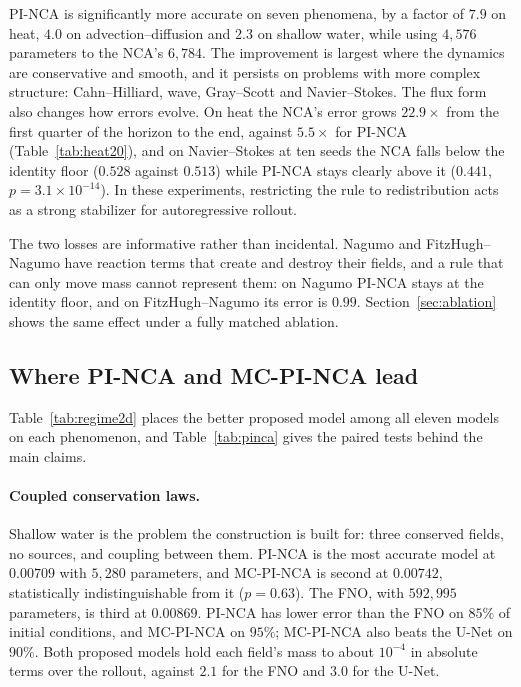 \documentclass{article}
\begin{document}
PI-NCA is significantly more accurate on seven phenomena, by a factor of $7.9$ on heat,
$4.0$ on advection--diffusion and $2.3$ on shallow water, while using $4{,}576$
parameters to the NCA's $6{,}784$. The improvement is largest where the dynamics are
conservative and smooth, and it persists on problems with more complex structure:
Cahn--Hilliard, wave, Gray--Scott and Navier--Stokes. The flux form also changes how errors
evolve. On heat the NCA's error grows $22.9\times$ from the first quarter of the horizon to
the end, against $5.5\times$ for PI-NCA (Table~\ref{tab:heat20}), and on Navier--Stokes at
ten seeds the NCA falls below the identity floor ($0.528$ against $0.513$) while PI-NCA
stays clearly above it ($0.441$, $p=3.1\times10^{-14}$). In these experiments, restricting
the rule to redistribution acts as a strong stabilizer for autoregressive rollout.

The two losses are informative rather than incidental. Nagumo and FitzHugh--Nagumo have
reaction terms that create and destroy their fields, and a rule that can only move mass
cannot represent them: on Nagumo PI-NCA stays at the identity floor, and on
FitzHugh--Nagumo its error is $0.99$. Section~\ref{sec:ablation} shows the same effect under
a fully matched ablation.

\subsection{Where PI-NCA and MC-PI-NCA lead}
\label{sec:leads}
Table~\ref{tab:regime2d} places the better proposed model among all eleven models on each
phenomenon, and Table~\ref{tab:pinca} gives the paired tests behind the main claims.



\paragraph{Coupled conservation laws.} Shallow water is the problem the construction is
built for: three conserved fields, no sources, and coupling between them. PI-NCA is the
most accurate model at $0.00709$ with $5{,}280$ parameters, and MC-PI-NCA is second at
$0.00742$, statistically indistinguishable from it ($p=0.63$). The FNO, with $592{,}995$
parameters, is third at $0.00869$. PI-NCA has lower error than the FNO on $85\%$ of initial
conditions, and MC-PI-NCA on $95\%$; MC-PI-NCA also beats the U-Net on $90\%$. Both proposed
models hold each field's mass to about $10^{-4}$ in absolute terms over the rollout, against
$2.1$ for the FNO and $3.0$ for the U-Net.
\end{document}
